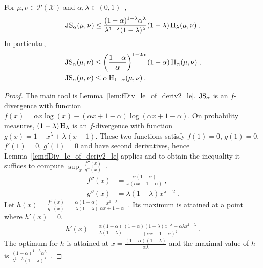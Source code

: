 \begin{lemma}
  \label{lem:jensenShannon_le_hellingerAlpha}
  For $\mu, \nu \in \mathcal P(\mathcal X)$ and $\alpha, \lambda \in (0,1)$~,
  \begin{align*}
  \operatorname{JS}_\alpha(\mu, \nu) \le \frac{(1 - \alpha)^{1 - \lambda} \alpha^\lambda}{\lambda^{1 - \lambda} (1 - \lambda)^\lambda} (1 - \lambda)\operatorname{H}_\lambda(\mu, \nu) \: .
  \end{align*}
  In particular,
  \begin{align*}
  \operatorname{JS}_\alpha(\mu, \nu)
  &\le \left(\frac{1 - \alpha}{\alpha}\right)^{1 - 2 \alpha} (1 - \alpha)\operatorname{H}_\alpha(\mu, \nu)
  \: , \\
  \operatorname{JS}_\alpha(\mu, \nu)
  &\le \alpha \operatorname{H}_{1 - \alpha}(\mu, \nu)
  \: .
  \end{align*}
\end{lemma}

\begin{proof}%
{}
The main tool is Lemma~\ref{lem:fDiv_le_of_deriv2_le}.
$\operatorname{JS}_\alpha$ is an $f$-divergence with function $f(x) = \alpha x \log(x) - (\alpha x + 1 - \alpha) \log (\alpha x + 1 - \alpha)$. On probability measures, $(1 - \lambda)\operatorname{H}_\lambda$ is an $f$-divergence with function $g(x) = 1 - x^\lambda + \lambda(x-1)$.
These two functions satisfy $f(1) = 0$, $g(1) = 0$, $f'(1) = 0$, $g'(1) = 0$ and have second derivatives, hence Lemma~\ref{lem:fDiv_le_of_deriv2_le} applies and to obtain the inequality it suffices to compute $\sup_x\frac{f''(x)}{g''(x)}$~.
\begin{align*}
f''(x)
&= \frac{\alpha(1 - \alpha)}{x(\alpha x + 1 - \alpha)}
\: , \\
g''(x)
&= \lambda (1 - \lambda) x^{\lambda - 2}
\: .
\end{align*}
Let $h(x) = \frac{f''(x)}{g''(x)} = \frac{\alpha (1 - \alpha)}{\lambda (1 - \lambda)} \frac{x^{1 - \lambda}}{\alpha x + 1 - \alpha}$~. Its maximum is attained at a point where $h'(x) = 0$.
\begin{align*}
h'(x) = \frac{\alpha (1 - \alpha)}{\lambda (1 - \lambda)} \frac{(1 - \alpha)(1 - \lambda)x^{-\lambda} - \alpha \lambda x^{1 - \lambda}}{(\alpha x + 1 - \alpha)^2}
\: .
\end{align*}
The optimum for $h$ is attained at $x = \frac{(1 - \alpha)(1 - \lambda)}{\alpha \lambda}$ and the maximal value of $h$ is $\frac{(1 - \alpha)^{1 - \lambda} \alpha^\lambda}{\lambda^{1 - \lambda} (1 - \lambda)^\lambda}$~.
\end{proof}


